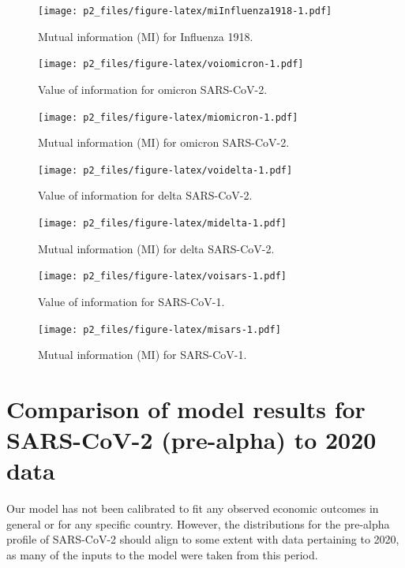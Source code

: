\documentclass[
]{article}
\begin{document}
\begin{figure}
\centering
\texttt{[image: p2\_files/figure-latex/miInfluenza1918-1.pdf]}
\caption{\label{fig:miInfluenza1918}Mutual information (MI) for Influenza 1918.}
\end{figure}

\begin{figure}
\centering
\texttt{[image: p2\_files/figure-latex/voiomicron-1.pdf]}
\caption{\label{fig:voiomicron}Value of information for omicron SARS-CoV-2.}
\end{figure}

\begin{figure}
\centering
\texttt{[image: p2\_files/figure-latex/miomicron-1.pdf]}
\caption{\label{fig:miomicron}Mutual information (MI) for omicron SARS-CoV-2.}
\end{figure}

\begin{figure}
\centering
\texttt{[image: p2\_files/figure-latex/voidelta-1.pdf]}
\caption{\label{fig:voidelta}Value of information for delta SARS-CoV-2.}
\end{figure}

\begin{figure}
\centering
\texttt{[image: p2\_files/figure-latex/midelta-1.pdf]}
\caption{\label{fig:midelta}Mutual information (MI) for delta SARS-CoV-2.}
\end{figure}

\begin{figure}
\centering
\texttt{[image: p2\_files/figure-latex/voisars-1.pdf]}
\caption{\label{fig:voisars}Value of information for SARS-CoV-1.}
\end{figure}

\begin{figure}
\centering
\texttt{[image: p2\_files/figure-latex/misars-1.pdf]}
\caption{\label{fig:misars}Mutual information (MI) for SARS-CoV-1.}
\end{figure}

\newpage

\hypertarget{comparison-of-model-results-for-sars-cov-2-pre-alpha-to-2020-data}{%
\section{Comparison of model results for SARS-CoV-2 (pre-alpha) to 2020 data}\label{comparison-of-model-results-for-sars-cov-2-pre-alpha-to-2020-data}}

Our model has not been calibrated to fit any observed economic outcomes in general or for any specific country. However, the distributions for the pre-alpha profile of SARS-CoV-2 should align to some extent with data pertaining to 2020, as many of the inputs to the model were taken from this period.
\end{document}
